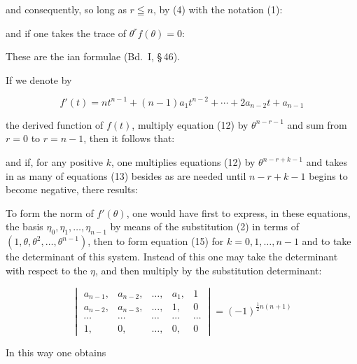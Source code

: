 and consequently, so long as $r \leqq n$, by (4) with the notation (1):


and if one takes the trace of $\theta^r f(\theta) = 0$:


These are the ian formulae (Bd.\ I, \S\,46).

If we denote by

\[
f'(t) = n t^{n-1} + (n-1)a_1 t^{n-2} + \cdots + 2a_{n-2}t + a_{n-1}
\]

the derived function of $f(t)$, multiply equation (12) by
$\theta^{n-r-1}$ and sum from $r=0$ to $r=n-1$, then it follows that:


and if, for any positive $k$, one multiplies equations (12) by
$\theta^{n-r+k-1}$ and takes in as many of equations (13) besides as are needed
until $n-r+k-1$ begins to become negative, there results:


To form the norm of $f'(\theta)$, one would have first to express, in these equations, the
basis $\eta_0, \eta_1, \ldots, \eta_{n-1}$ by means of the substitution (2) in terms of
$(1, \theta, \theta^2, \ldots, \theta^{n-1})$, then to form equation (15) for
$k = 0, 1, \ldots, n-1$ and to take the determinant of this system. Instead of
this one may take the determinant with respect to the $\eta$, and then multiply by the
substitution determinant:

\[
\begin{vmatrix}
a_{n-1}, & a_{n-2}, & \ldots, & a_1, & 1 \\
a_{n-2}, & a_{n-3}, & \ldots, & 1, & 0 \\
\cdots & \cdots & \cdots & \cdots & \cdots \\
1, & 0, & \ldots, & 0, & 0
\end{vmatrix}
= (-1)^{\frac{1}{2}n(n+1)}
\]

In this way one obtains


